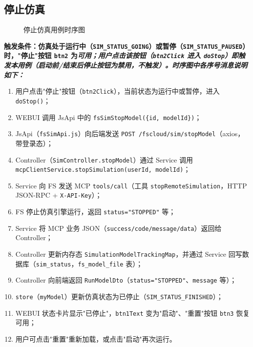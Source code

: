 \subsection{停止仿真}
\begin{figure}[!h]
	\centering
	\resizebox{1.0\linewidth}{!}{}
	\caption{停止仿真用例时序图}\label{fig:stopModel}
\end{figure}
\bf{触发条件}：仿真处于运行中（\texttt{SIM\_STATUS\_GOING}）或暂停（\texttt{SIM\_STATUS\_PAUSED}）时，"停止"按钮 \texttt{btn2} 为\it{可用}；用户点击该按钮（\texttt{btn2Click} 进入 \texttt{doStop}）即触发本用例（启动前/结束后停止按钮为禁用，不触发）。时序图中各序号消息说明如下：
\begin{enumerate}[label=\arabic*)]
	\item 用户点击"停止"按钮（\texttt{btn2Click}），当前状态为运行中或暂停，进入 \texttt{doStop()}；
	\item WEBUI 调用 JsApi 中的 \texttt{fsSimStopModel(\{id, modelId\})}；
	\item JsApi（\texttt{fsSimApi.js}）向后端发送 \texttt{POST /fscloud/sim/stopModel}（axios，带登录态）；
	\item Controller（\texttt{SimController.stopModel}）通过 Service 调用 \texttt{mcpClientService.stopSimulation(userId, modelId)}；
	\item Service 向 FS 发送 MCP \texttt{tools/call}（工具 \texttt{stopRemoteSimulation}，HTTP JSON-RPC + \texttt{X-API-Key}）；
	\item FS 停止仿真引擎运行，返回 \texttt{status="STOPPED"} 等；
	\item Service 将 MCP 业务 JSON（\texttt{success/code/message/data}）返回给 Controller；
	\item Controller 更新内存态 \texttt{SimulationModelTrackingMap}，并通过 Service 回写数据库（\texttt{sim\_status}，\texttt{fs\_model\_file} 表）；
	\item Controller 向前端返回 \texttt{RunModelDto}（\texttt{status="STOPPED"}、\texttt{message} 等）；
	\item \texttt{store}（\texttt{myModel}）更新仿真状态为已停止（\texttt{SIM\_STATUS\_FINISHED}）；
	\item WEBUI 状态卡片显示"已停止"，\texttt{btn1Text} 变为"启动"、"重置"按钮 \texttt{btn3} 恢复可用；
	\item 用户可点击"重置"重新加载，或点击"启动"再次运行。
\end{enumerate}
\newpage
